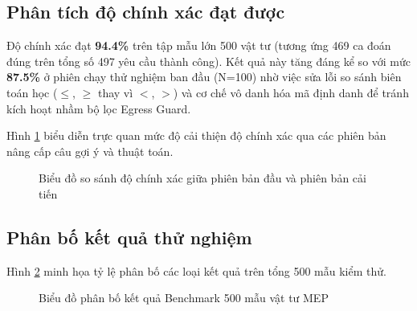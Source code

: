 \subsection{Phân tích độ chính xác đạt được}

Độ chính xác đạt \textbf{94.4\%} trên tập mẫu lớn 500 vật tư (tương ứng 469 ca đoán đúng trên tổng số 497 yêu cầu thành công). Kết quả này tăng đáng kể so với mức \textbf{87.5\%} ở phiên chạy thử nghiệm ban đầu (N=100) nhờ việc sửa lỗi so sánh biên toán học ($\leq$, $\geq$ thay vì $<$, $>$) và cơ chế vô danh hóa mã định danh để tránh kích hoạt nhầm bộ lọc Egress Guard.

Hình \ref{fig:accuracy_chart} biểu diễn trực quan mức độ cải thiện độ chính xác qua các phiên bản nâng cấp câu gợi ý và thuật toán.

\begin{figure}[H]
    \centering
    \caption{Biểu đồ so sánh độ chính xác giữa phiên bản đầu và phiên bản cải tiến}
    \label{fig:accuracy_chart}
\end{figure}

\subsection{Phân bố kết quả thử nghiệm}

Hình \ref{fig:error_pie} minh họa tỷ lệ phân bố các loại kết quả trên tổng 500 mẫu kiểm thử.

\begin{figure}[H]
    \centering
    \caption{Biểu đồ phân bố kết quả Benchmark 500 mẫu vật tư MEP}
    \label{fig:error_pie}
\end{figure}

